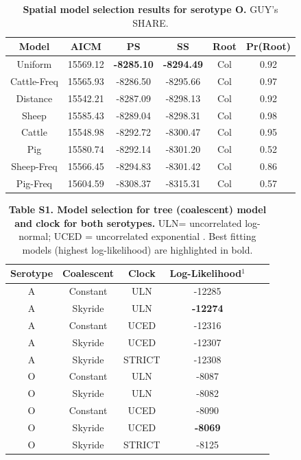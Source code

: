\documentclass[10pt]{article}
\begin{document}
\begin{table}[!ht]
\caption{
\textbf{Spatial model selection results for serotype O. } GUY's SHARE.}
\begin{tabular}{cccccc}
\toprule
Model	&AICM	&PS	&SS	&Root	&Pr(Root)\\
\midrule
Uniform	&15569.12	&\textbf{-8285.10}	&\textbf{-8294.49}	&Col	&0.92\\
Cattle-Freq	&15565.93	&-8286.50	&-8295.66	&Col	&0.97\\
Distance	&15542.21	&-8287.09	&-8298.13	&Col	&0.92\\
Sheep	&15585.43	&-8289.04	&-8298.31	&Col	&0.98\\
Cattle	&15548.98	&-8292.72	&-8300.47	&Col	&0.95\\
Pig	&15580.74	&-8292.14	&-8301.20	&Col	&0.52\\
Sheep-Freq	&15566.45	&-8294.83	&-8301.42	&Col	&0.86\\
Pig-Freq	&15604.59	&-8308.37	&-8315.31	&Col	&0.57\\
\bottomrule
\end{tabular}
\begin{flushleft}
\end{flushleft}
\label{tab:prootO}
 \end{table}
\newpage
\begin{table}[!ht]
\caption*{\textbf{Table S1. Model selection for tree (coalescent) model and clock for both serotypes.}  ULN= uncorrelated log-normal; UCED = uncorrelated exponential . Best fitting models (highest log-likelihood) are highlighted in bold.}
\begin{tabular}{cccccc}
\toprule
Serotype	&Coalescent	&Clock	&Log-Likelihood$^{1}$\\
\midrule
A	&Constant	&ULN	&-12285\\
A	&Skyride 	&ULN	&\textbf{-12274}\\
A	&Constant	&UCED	&-12316\\
A	&Skyride 	&UCED	&-12307\\
A       &Skyride       &STRICT &-12308\\
O	&Constant	&ULN	&-8087\\
O	&Skyride 	&ULN	&-8082\\
O	&Constant	&UCED	&-8090\\
O	&Skyride 	&UCED	&\textbf{-8069}\\
O       &Skyride       &STRICT &-8125\\
\bottomrule
\end{tabular}
\begin{flushleft}
\end{flushleft}
\label{stab:treeclockselection}
 \end{table}
\end{document}
